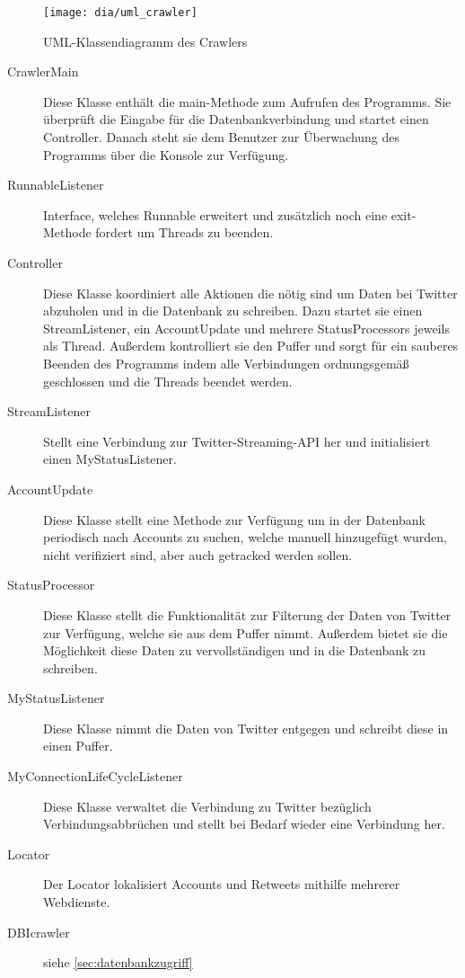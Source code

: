 \begin{figure}[h!]
	\centering
	\texttt{[image: dia/uml\_crawler]}
	\caption{UML-Klassendiagramm des Crawlers}
	\label{fig:uml_crawler}
\end{figure}

\begin{description}
\item[CrawlerMain] Diese Klasse enthält die main-Methode zum Aufrufen des Programms. Sie überprüft die Eingabe für die Datenbankverbindung und startet einen Controller. Danach steht sie dem Benutzer zur Überwachung des Programms über die Konsole zur Verfügung.
\item[RunnableListener] Interface, welches Runnable erweitert und zusätzlich noch eine exit-Methode fordert um Threads zu beenden.
\item[Controller] Diese Klasse koordiniert alle Aktionen die nötig sind um Daten bei Twitter abzuholen und in die Datenbank zu schreiben. Dazu startet sie einen StreamListener, ein AccountUpdate und mehrere StatusProcessors jeweils als Thread. Außerdem kontrolliert sie den Puffer und sorgt für ein sauberes Beenden des Programms indem alle Verbindungen ordnungsgemäß geschlossen und die Threads beendet werden.
\item[StreamListener] Stellt eine Verbindung zur Twitter-Streaming-API her und initialisiert einen MyStatusListener.
\item[AccountUpdate] Diese Klasse stellt eine Methode zur Verfügung um in der Datenbank periodisch nach Accounts zu suchen, welche manuell hinzugefügt wurden, nicht verifiziert sind, aber auch getracked werden sollen.
\item[StatusProcessor] Diese Klasse stellt die Funktionalität zur Filterung der Daten von Twitter zur Verfügung, welche sie aus dem Puffer nimmt. Außerdem bietet sie die Möglichkeit diese Daten zu vervollständigen und in die Datenbank zu schreiben.
\item[MyStatusListener] Diese Klasse nimmt die Daten von Twitter entgegen und schreibt diese in einen Puffer.
\item[MyConnectionLifeCycleListener] Diese Klasse verwaltet die Verbindung zu Twitter bezüglich Verbindungsabbrüchen und stellt bei Bedarf wieder eine Verbindung her.
\item[Locator] Der Locator lokalisiert Accounts und Retweets mithilfe mehrerer Webdienste.
\item[DBIcrawler] siehe \cref{sec:datenbankzugriff}
\end{description}

